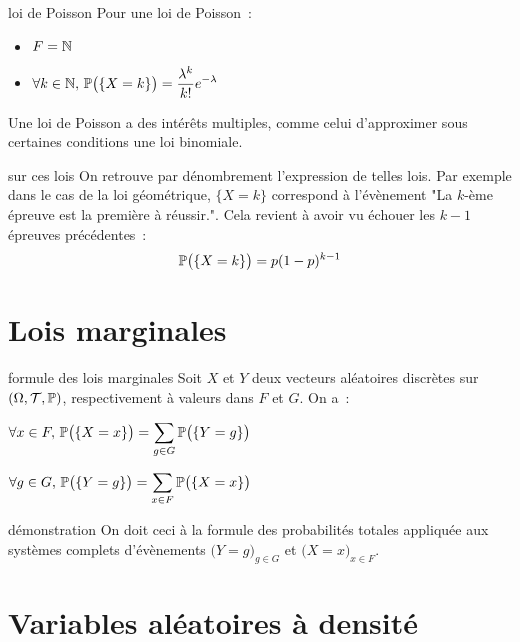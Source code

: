 \begin{exemple}{}{loi de Poisson}
    Pour une loi de Poisson~:
    \begin{itemize}
        \item $\displaystyle F = \mathbb{N}$
        \item $\displaystyle \forall k \in \mathbb{N},\, \mathbb{P}\big(\{X = k\}\big) = \frac{\lambda^k}{k!}e^{-\lambda}$
        
    \end{itemize}
    Une loi de Poisson a des intérêts multiples, comme celui d'approximer sous certaines conditions une loi binomiale.
\end{exemple}

\begin{remarque}{}{sur ces lois}
    On retrouve par dénombrement l'expression de telles lois. Par exemple dans le cas de la loi géométrique, $\{X = k\}$ correspond à l'évènement "La $k$-ème épreuve est la première à réussir.". Cela revient à avoir vu échouer les $k-1$ épreuves précédentes~:
    $$\mathbb{P}\big(\{X = k\}\big) = p (1-p)^{k-1}$$
\end{remarque}


\section{Lois marginales}

\begin{proposition}{}{formule des lois marginales}
    Soit $X$ et $Y$ deux vecteurs aléatoires discrètes sur $(\Omega, \mathcal{T}, \mathbb{P})$, respectivement à valeurs dans $F$ et $G$. On a~:
    \begin{enumeratebf}
        \item $\displaystyle \forall x \in F,\, \mathbb{P}\big(\{X=x\}\big) = \sum_{g \in G}\mathbb{P}\big(\{Y = g\}\big)$
        \item $\displaystyle \forall g \in G,\, \mathbb{P}\big(\{Y=g\}\big) = \sum_{x \in F}\mathbb{P}\big(\{X = x\}\big)$
    \end{enumeratebf}
\end{proposition}

\begin{remarque}{}{démonstration}
    On doit ceci à la formule des probabilités totales appliquée aux systèmes complets d'évènements $\Big( Y=g \Big)_{g \in G}$ et $\Big( X=x \Big)_{x \in F}$.
\end{remarque}

\section{Variables aléatoires à densité}

